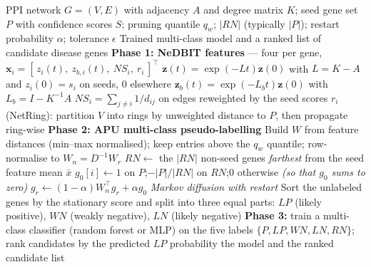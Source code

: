 \documentclass{article}
\begin{document}
\begin{algorithm}[!h]
\renewcommand{\algorithmicrequire}{\textbf{Input:}}
\renewcommand{\algorithmicensure}{\textbf{Output:}}
	\caption{NIAPU: network-informed adaptive PU learning for disease gene identification}
	\begin{algorithmic}[1]
	    \REQUIRE
	    PPI network $G=(V,E)$ with adjacency $A$ and degree matrix $K$;
	    seed gene set $P$ with confidence scores $S$;
	    pruning quantile $q_{w}$; $|RN|$ (typically $|P|$); restart probability $\alpha$;
	    tolerance $\epsilon$
	    \ENSURE
	    Trained multi-class model and a ranked list of candidate disease genes
	    \STATE \textbf{Phase 1: NeDBIT features} --- four per gene,
	    $\mathbf{x}_{i}=[\,z_{i}(t),\ z_{b,i}(t),\ NS_{i},\ r_{i}\,]^{\top}$
	    \STATE \quad $\mathbf{z}(t)=\exp(-Lt)\mathbf{z}(0)$ with $L=K-A$ and
	    $z_{i}(0)=s_{i}$ on seeds, $0$ elsewhere %
	    \STATE \quad $\mathbf{z}_{b}(t)=\exp(-L_{b}t)\mathbf{z}(0)$ with $L_{b}=I-K^{-1}A$ %
	    \STATE \quad $NS_{i}=\sum_{j\neq i}1/d_{ij}$ on edges reweighted by the seed scores
	    \STATE \quad $r_{i}$ (NetRing): partition $V$ into rings by unweighted distance to $P$,
	    then propagate ring-wise %
	    \STATE \textbf{Phase 2: APU multi-class pseudo-labelling}
	    \STATE Build $W$ from feature distances (min--max normalised); keep entries above the
	    $q_{w}$ quantile; row-normalise to $W_{n}=D^{-1}W_{r}$ %
	    \STATE $RN\leftarrow$ the $|RN|$ non-seed genes \emph{farthest} from the seed feature mean
	    $\bar{x}$
	    \STATE $g_{0}[i]\leftarrow 1$ on $P$;\quad $-|P|/|RN|$ on $RN$;\quad $0$ otherwise
	    \hfill \emph{(so that $g_{0}$ sums to zero)} %
	    \REPEAT
	    \STATE $g_{r}\leftarrow (1-\alpha)W_{n}^{\top}g_{r}+\alpha g_{0}$
	    \hfill \emph{Markov diffusion with restart}
	    \STATE Sort the unlabeled genes by the stationary score and split into three equal parts:
	    $LP$ (likely positive), $WN$ (weakly negative), $LN$ (likely negative)
	    \STATE \textbf{Phase 3:} train a multi-class classifier (random forest or MLP) on the five
	    labels $\{P,LP,WN,LN,RN\}$; rank candidates by the predicted $LP$ probability %
		\RETURN the model and the ranked candidate list
	\end{algorithmic}
\end{algorithm}
\end{document}
